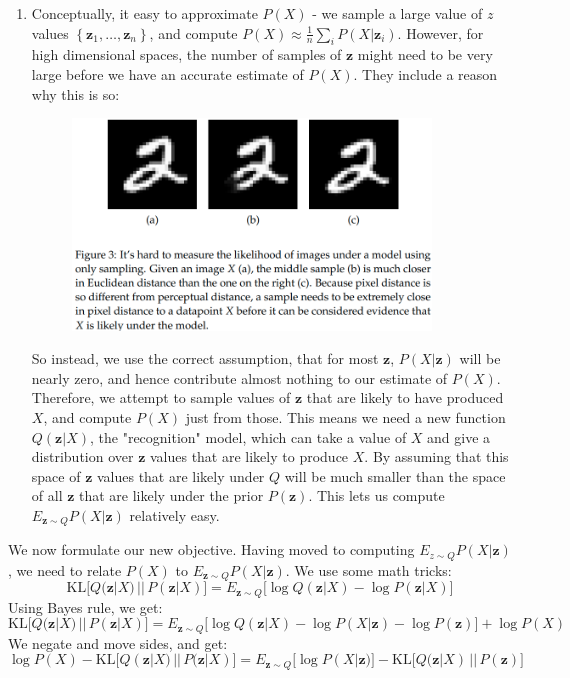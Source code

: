 \documentclass{article}
\begin{document}
\begin{enumerate}
  \item Conceptually, it easy to approximate $P(X)$  - we sample a large value of $z$ values $\left\{ \bm{z}_1, \ldots, \bm{z}_n \right\}$, and compute $P(X) \approx \frac{1}{n} \sum_{i} P(X| \bm{z}_i)$. 
  However, for high dimensional spaces, the number of samples of $\bm{z}$ might need to be very large before we have an accurate estimate of $P(X)$. 
  They include a reason why this is so:
\begin{figure}[H] \centering \includegraphics[height=0.3\textheight,width=0.9\textwidth,keepaspectratio]{samplingOnlyLikelihood}  \label{fig:samplingOnlyLikelihood} \end{figure}
  So instead, we use the correct assumption, that for most $\bm{z}$, $P(X|\bm{z})$ will be nearly zero, and hence contribute almost nothing to our estimate of $P(X)$. 
  Therefore, we attempt to sample values of $\bm{z}$ that are likely to have produced $X$, and compute $P(X)$ just from those.  
  This means we need a new function $Q(\bm{z}|X)$, the "recognition" model, which can take a value of $X$ and give a distribution over $\bm{z}$ values that are likely to produce $X$. 
  By assuming that this space of $\bm{z}$ values that are likely under $Q$ will be much smaller than the space of all $\bm{z}$  that are likely under the prior $P(\bm{z})$. 
  This lets us compute $E_{\bm{z} \sim Q} P(X|\bm{z})$ relatively easy. 

\end{enumerate}

We now formulate our new objective. Having moved to computing $E_{z \sim  Q}P(X | \bm{z})$, we need to relate $P(X)$ to $E_{\bm{z} \sim  Q} P(X | \bm{z})$. We use some math tricks:
\[
  \mathrm{KL} \Big[Q(\bm{z}|X) \,||\, P(\bm{z} |X) \Big] = E_{\bm{z} \sim Q} \Big[ \log Q( \bm{z}|X) - \log P(\bm{z} | X) \Big]
\]
Using Bayes rule, we get:
\[
  \mathrm{KL} \Big[ Q(\bm{z} | X) \,||\, P( \bm{z} |X)  \Big] = E_{\bm{z} \sim  Q}  \Big[ \log Q(\bm{z} | X) - \log P(X| \bm{z}) - \log P(\bm{z}) \Big] + \log P(X)
\]
We negate and move sides, and get:
\begin{equation} \label{eq:DoreschEq5}
  \log P(X) - \mathrm{KL} \Big[ Q(\bm{z} | X) \,||\, P(\bm{z} | X)  \Big] = E_{\bm{z} \sim  Q} \Big[ \log P(X| \bm{z}) \Big] - \mathrm{KL} \Big[ Q(\bm{z} | X) \,||\, P(\bm{z}) \Big]
\end{equation}
\end{document}
